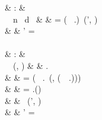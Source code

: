 \begin{figure}[H]
\begin{functioncode}{
                                                    &   :           &   \State \to \Intdomain \to \Booldomain \to \Optiontype{\State \times \Block} \\
 \ \Statevar \ n \ d \                              &   \triangleq  &   \pseudolet \Blockvar = ( \ \Statevar.\Memstatemember)\errbind \ \pseudoin (\Statevar', \Blockvar)  \\
                                                                    &               &   \quad \pseudowhere \Statevar' = \Statevar \pseudowith [\Memstatemember :=   \\
                                                                    &               &   \quad\quad \Statevar.\Memstatemember  \set{ \Blockvar \leftarrow [\Memblockmemberhi := n, \Memblockmemberdyn := d, \Memblockmembercontent := \setbuild{\delta \leftarrow \vundef}{\delta \in (0 \dots n)}] } \\
                                                                    &               &   \quad ] \\~\\
                                                     &   :           &   \State \to \Loc \to \Optiontype{\State \times \Val} \\
 \ \Statevar \ (\Simplelocvar, \Basesvar)            &   \triangleq  &   \pseudoif \Statevar.\Memstatemember \validsym \Simplelocvar \ \pseudothen \\
                                                                    &               &   \quad \pseudolet \Restrictstackvar = ( \ \Statevar.\Restrictstatemember \ (\Simplelocvar, (\filterinactive \ \Basesvar \ \Statevar.\Scopesstatemember))) \errbind \ \pseudoin \\
                                                                    &               &   \quad \quad \pseudolet \Valvar = \Statevar.\Memstatemember(\Simplelocvar) \ \pseudoin \\
                                                                    &               &   \quad \quad\quad \pseudoif \Valvar \neq \vundef \ \pseudothen (\Statevar', \Valvar) \\ 
                                                                    &               &   \quad \quad\quad\quad \pseudowhere \Statevar' = \Statevar \pseudowith [\Restrictstatemember := R] \\
}
\end{functioncode}
\end{figure}
